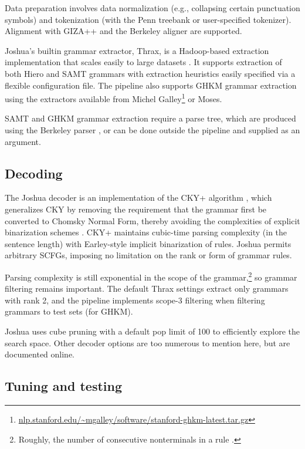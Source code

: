 \documentclass[11pt]{article}
\begin{document}
Data preparation involves data normalization (e.g., collapsing certain
punctuation symbols) and tokenization (with the Penn treebank or
user-specified tokenizer).  Alignment with GIZA++ \cite{giza} and the
Berkeley aligner \cite{berkeley-aligner} are supported.

Joshua's builtin grammar extractor, Thrax, is a Hadoop-based
extraction implementation that scales easily to large
datasets \cite{PPDB}.  It supports extraction of both Hiero
\cite{Chiang2005} and SAMT grammars \cite{samt2006} with extraction
heuristics easily specified via a flexible configuration file. The
pipeline also supports GHKM grammar extraction
\cite{galley2006scalable} using the extractors available from Michel
Galley\footnote{\url{nlp.stanford.edu/~mgalley/software/stanford-ghkm-latest.tar.gz}}
or Moses.

SAMT and GHKM grammar extraction require a parse tree, which are
produced using the Berkeley parser \cite{petrov2006learning}, or can
be done outside the pipeline and supplied as an argument.

\subsection{Decoding}

The Joshua decoder is an implementation of the CKY+ algorithm
\cite{chappelier1998generalized}, which generalizes CKY by removing
the requirement that the grammar first be converted to Chomsky Normal
Form, thereby avoiding the complexities of explicit binarization
schemes \cite{zhang2006synchronous,denero2009asynchronous}. CKY+
maintains cubic-time parsing complexity (in the sentence length) with
Earley-style implicit binarization of rules. Joshua permits arbitrary
SCFGs, imposing no limitation on the rank or form of grammar rules.

Parsing complexity is still exponential in the scope of the
grammar,\footnote{Roughly, the number of consecutive nonterminals in a
  rule \cite{hopkins2010scfg}.} so grammar filtering remains
important.  The default Thrax settings extract only grammars with rank
2, and the pipeline implements scope-3 filtering \cite{hopkins2010scfg}
when filtering grammars to test sets (for GHKM).

Joshua uses cube pruning \cite{Chiang2007} with a default pop limit of
100 to efficiently explore the search space. Other decoder options are
too numerous to mention here, but are documented online.

\subsection{Tuning and testing}
\end{document}
